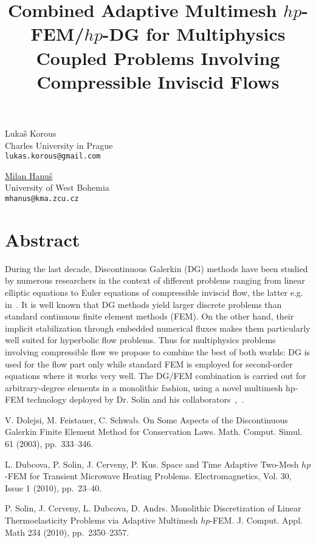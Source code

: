 \title{Combined Adaptive Multimesh $hp$-FEM/$hp$-DG for Multiphysics Coupled Problems Involving Compressible Inviscid Flows}
\author{} \institute{}
\maketitle

\begin{center}
{\large Luka\v s Korous}\\
Charles University in Prague\\
{\tt lukas.korous@gmail.com}\\
\vspace{4mm}

{\large \underline{Milan Hanu\v s}}\\
University of West Bohemia\\
{\tt mhanus@kma.zcu.cz}
\end{center}

\section*{Abstract}
During the last decade, Discontinuous Galerkin (DG) methods have been studied by numerous researchers in the context of different problems ranging from linear elliptic equations to Euler equations of compressible inviscid flow, the latter e.g. in~\cite{1}. It is well known that DG methods yield larger discrete problems than standard continuous finite element methods (FEM). On the other hand, their implicit stabilization through embedded numerical fluxes makes them particularly well
suited for hyperbolic flow problems. Thus for multiphysics problems involving compressible flow we propose to combine the best of both worlds: DG is used for the flow part only while standard FEM is employed for second-order equations where it works very well. The DG/FEM combination is carried out for arbitrary-degree elements in a monolithic fashion, using a novel multimesh hp-FEM technology deployed by Dr. Solin and his collaborators~\cite{2},~\cite{3}.


\begin{thebibliography}{10}
{\sc V. Dolejsi, M. Feistauer, C. Schwab}. {On Some Aspects of the Discontinuous Galerkin Finite Element Method for Conservation Laws}. Math. Comput. Simul. 61 (2003), pp.~333--346.

{\sc L. Dubcova, P. Solin, J. Cerveny, P. Kus}. {Space and Time Adaptive Two-Mesh $hp$-FEM for Transient Microwave Heating Problems}. Electromagnetics, Vol. 30, Issue 1 (2010), pp.~23--40.

{\sc P. Solin, J. Cerveny, L. Dubcova, D. Andrs}. {Monolithic Discretization of Linear Thermoelasticity Problems via Adaptive Multimesh $hp$-FEM}. J. Comput. Appl. Math 234 (2010), pp.~2350--2357.
\end{thebibliography}